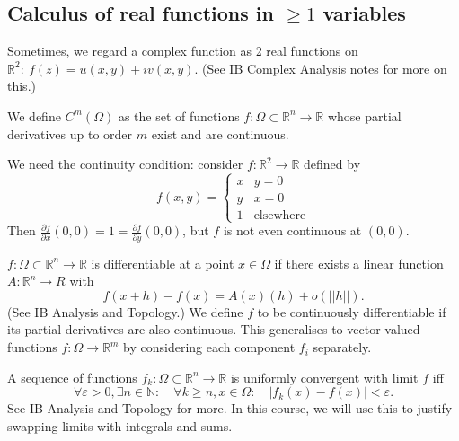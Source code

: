 \documentclass[a4paper]{scrartcl}
\begin{document}
\subsection{Calculus of real functions in $\geq 1$ variables}
Sometimes, we regard a complex function as 2 real functions on $\mathbb{R}^{2} : \ f (z)=u (x,y)+iv (x,y)$. (See IB Complex Analysis notes for more on this.)

\begin{definition*}
     We define $C^{m}(\Omega)$ as the set of functions $f: \Omega \subset \mathbb{R}^{n} \rightarrow \mathbb{R}$ whose partial derivatives up to order $m$ exist and are continuous. 
\end{definition*}
\begin{remark}
     We need the continuity condition: consider $f: \mathbb{R}^{2} \rightarrow \mathbb{R}$ defined by
     \begin{equation*}
        f (x,y)=
          \begin{cases}
              x & y=0\\
              y & x=0 \\
              1 & \text{elsewhere}
          \end{cases}      
     \end{equation*}
    Then $\frac{\partial f}{\partial x}(0,0)=1=\frac{\partial f}{\partial y}(0,0)$, but $f$ is not even continuous at $(0,0)$. 
\end{remark}

\begin{definition*}
     $f: \Omega \subset \mathbb{R}^{n} \rightarrow \mathbb{R}$ is differentiable at a point $x \in \Omega$ if there exists a linear function $A: \mathbb{R}^{n} \rightarrow R$ with \[
     f (x+h)-f (x)=A (x)(h) +o (||h||)
     .\] (See IB Analysis and Topology.) We define $f$ to be continuously differentiable if its partial derivatives are also continuous. This generalises to vector-valued functions $f: \Omega \rightarrow \mathbb{R}^{m}$ by considering each component $f_{i}$ separately.  
\end{definition*}

\begin{definition*}
     A sequence of functions $f_{k}: \Omega \subset \mathbb{R}^{n} \rightarrow \mathbb{R}$ is uniformly convergent with limit $f$ iff \[
     \forall \varepsilon>0, \exists n \in \mathbb{N}: \quad  \forall k \geq n, x \in \Omega: \quad |f_{k} (x)- f (x)|< \varepsilon
     .\]
     See IB Analysis and Topology for more. In this course, we will use this to justify swapping limits with integrals and sums. 
\end{definition*}
\end{document}
